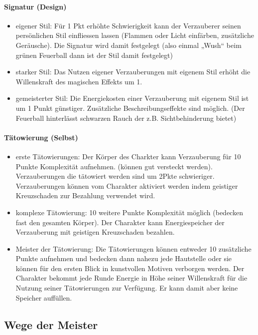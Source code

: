 \documentclass{article}
\begin{document}
\paragraph{Signatur (Design)}

\begin{itemize}
\item eigener Stil: Für 1 Pkt erhöhte Schwierigkeit kann der Verzauberer seinen persönlichen Stil einfliessen lassen (Flammen oder Licht einfärben, zusätzliche Geräusche). Die Signatur wird damit festgelegt (also einmal „Wush“ beim grünen Feuerball dann ist der Stil damit festgelegt)
\item starker Stil: Das Nutzen eigener Verzauberungen mit eigenem Stil erhöht die Willenskraft des magischen Effekts um 1.
\item gemeisterter Stil: Die Energiekosten einer Verzauberung mit eigenem Stil ist um 1 Punkt günstiger. Zusätzliche Beschreibungseffekte sind möglich. (Der Feuerball hinterlässt schwarzen Rauch der z.B. Sichtbehinderung bietet)
\end{itemize}

\paragraph{Tätowierung (Selbst)}

\begin{itemize}
\item erste Tätowierungen: Der Körper des Charkter kann Verzauberung für 10 Punkte Komplexität aufnehmen. (können gut versteckt werden). Verzauberungen die tätowiert werden sind um 2Pkte schwieriger. Verzauberungen können vom Charakter aktiviert werden indem geistiger Kreuzschaden zur Bezahlung verwendet wird.
\item komplexe Tätowierung: 10 weitere Punkte Komplexität möglich (bedecken fast den gesamten Körper). Der Charakter kann Energiespeicher der Verzauberung mit geistigen Kreuzschaden bezahlen.
\item Meister der Tätowierung: Die Tätowierungen können entweder 10 zusätzliche Punkte aufnehmen und bedecken dann nahezu jede Hautstelle oder sie können für den ersten Blick in kunstvollen Motiven verborgen werden. Der Charakter bekommt jede Runde Energie in Höhe seiner Willenskraft für die Nutzung seiner Tätowierungen zur Verfügung. Er kann damit aber keine Speicher auffüllen.
\end{itemize}

\begin{center}
\section{Wege der Meister}
\end{center}
\end{document}
